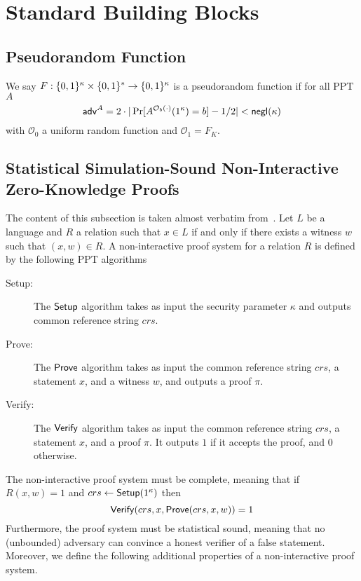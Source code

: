 \documentclass{llncs}
\begin{document}
\clearpage

\section{Standard Building Blocks}\label{app:bb}

\subsection{Pseudorandom Function}
\begin{defi}[PRF]
We say $F : \{0,1\}^\kappa \times \{0,1\}^* \to \{0,1\}^\kappa$ is a pseudorandom function if for all PPT $A$ 
$$\mathsf{adv}^{A} = 2\cdot|\Pr[A^{\mathcal{O}_b(\cdot)}(1^\kappa)=b]-1/2|<\mathsf{negl}(\kappa)$$ with $\mathcal{O}_0$ a uniform random function and $\mathcal{O}_1=F_K$.  \end{defi}

\subsection{Statistical Simulation-Sound Non-Interactive Zero-Knowledge Proofs} \label{app:nizk_sss}
The content of this subsection is taken almost verbatim from~\cite{DBLP:conf/focs/GargGH0SW13}.
Let $L$ be a language and $R$ a relation such that $x \in L$ if and only if there exists a witness $w$ such that $(x,w) \in R$.
A non-interactive proof system \cite{DBLP:conf/stoc/BlumFM88} for a relation $R$ is defined by the following PPT algorithms
\begin{description}
\item[Setup:] The $\mathsf{Setup}$ algorithm takes as input the security parameter $\kappa$ and outputs common reference string $crs$.

\item[Prove:] The $\mathsf{Prove}$ algorithm takes as input the common reference string $crs$, a statement $x$, and a witness $w$, and outputs a proof $\pi$.

\item[Verify:] The $\mathsf{Verify}$ algorithm takes as input the common reference string $crs$, a statement $x$, and a proof $\pi$. It outputs $1$ if it accepts the proof, and $0$ otherwise.
\end{description}

The non-interactive proof system must be complete, meaning that if $R(x,w)=1$  and $crs \leftarrow \mathsf{Setup}(1^\kappa)$ then $$\mathsf{Verify}(crs,x,\mathsf{Prove}(crs,x,w)) = 1$$  
Furthermore, the proof system must be statistical sound, meaning that no (unbounded) adversary can convince a honest verifier of a false statement.
Moreover, we define the following additional properties of a non-interactive proof system.
\end{document}
